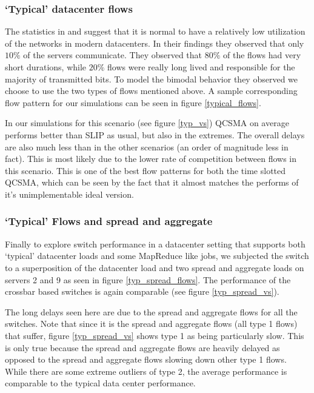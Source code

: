 \documentclass{IEEEtran}%
\begin{document}
\subsubsection{`Typical' datacenter flows}
The statistics in \cite{Benson} and \cite{Kandula} suggest that it is normal to have a relatively low utilization of the networks in modern datacenters.  In their findings they observed that only $10\%$ of the servers communicate.  They observed that $80\%$ of the flows had very short durations, while $20\%$ flows were really long lived and responsible for the majority of transmitted bits.  To model the bimodal behavior they observed we choose to use the two types of flows mentioned above.  A sample corresponding flow pattern for our simulations can be seen in figure \ref{typical_flows}.


In our simulations for this scenario (see figure \ref{typ_vs}) QCSMA on average performs better than SLIP as usual, but also in the extremes.  The overall delays are also much less than in the other scenarios (an order of magnitude less in fact).  This is most likely due to the lower rate of competition between flows in this scenario.  This is one of the best flow patterns for both the time slotted QCSMA, which can be seen by the fact that it almost matches the performs of it's unimplementable ideal version.

%

\subsubsection{`Typical' Flows and spread and aggregate}
Finally to explore switch performance in a datacenter setting that supports both  `typical' datacenter loads and some MapReduce like jobs, we subjected the switch to a superposition of the datacenter load and two spread and aggregate loads on servers 2 and 9 as seen in figure \ref{typ_spread_flows}.  The performance of the crossbar based switches is again comparable (see figure \ref{typ_spread_vs}).

The long delays seen here are due to the spread and aggregate flows for all the switches.  Note that since it is the spread and aggregate flows (all type 1 flows) that suffer, figure \ref{typ_spread_vs} shows type 1 as being particularly slow.  This is only true because the spread and aggregate flows are heavily delayed as opposed to the spread and aggregate flows slowing down other type 1 flows.  While there are some extreme outliers of type 2, the average performance is comparable to the typical data center performance.
\end{document}
